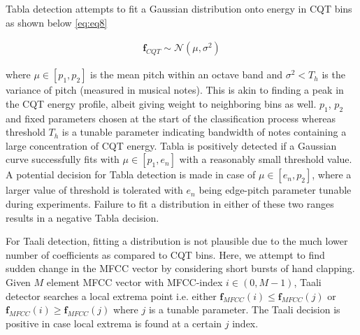 \documentclass{article}
\begin{document}
Tabla detection attempts to fit a Gaussian distribution onto energy in CQT bins as shown below \ref{eq:eq8}

\begin{align}\label{eq:eq8}
\boldsymbol{f}_{CQT} \sim \mathcal{N}(\mu, \sigma^{2})
\end{align}

where $\mu \in [p_{1}, p_{2}]$ is the mean pitch within an octave band and $\sigma^{2} < T_{h}$ is the variance of pitch (measured in musical notes). This is akin to finding a peak in the CQT energy profile, albeit giving weight to neighboring bins as well. $p_{1}$, $p_{2}$ and fixed parameters chosen at the start of the classification process whereas threshold $T_{h}$ is a tunable parameter indicating bandwidth of notes containing a large concentration of CQT energy. Tabla is positively detected if a Gaussian curve successfully fits with $\mu \in [p_{1}, e_{n}]$ with a reasonably small threshold value. A potential decision for Tabla detection is made in case of $\mu \in [e_{n}, p_{2}]$, where a larger value of threshold is tolerated with $e_{n}$ being edge-pitch parameter tunable during experiments.  Failure to fit a distribution in either of these two ranges results in a negative Tabla decision. 

For Taali detection, fitting a distribution is not plausible due to the much lower number of coefficients as compared to CQT bins. Here, we attempt to find sudden change in the MFCC vector by considering short bursts of hand clapping. Given $M$ element MFCC vector with MFCC-index $i \in (0, M-1)$, Taali detector searches a local extrema point i.e. either $\boldsymbol{f}_{MFCC}(i) \leq \boldsymbol{f}_{MFCC}(j)$ or $\boldsymbol{f}_{MFCC}(i) \geq \boldsymbol{f}_{MFCC}(j)$ where $j$ is a tunable parameter. The Taali decision is positive in case local extrema is found at a certain $j$ index.
\end{document}
